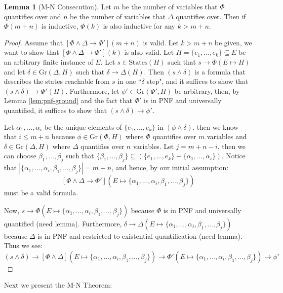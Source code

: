 \documentclass[12pt]{article}
\theoremstyle{definition}
\newtheorem{lemma}{Lemma}
\theoremstyle{remark}
\newcommand{\states}{\text{States}}
\newcommand{\gr}{\text{Gr}}
\begin{document}
\begin{lemma}[M-N Consecution]
  Let $m$ be the number of variables that $\Phi$ quantifies over and $n$ be the number of variables that $\Delta$ quantifies over.  Then if $\Phi(m+n)$ is inductive, $\Phi(k)$ is also inductive for any $k>m+n$.
\end{lemma}
\begin{proof}
  Assume that $[\Phi\land\Delta \rightarrow \Phi'](m+n)$ is valid.  Let $k>m+n$ be given, we want to show that $[\Phi\land\Delta \rightarrow \Phi'](k)$ is also valid.  Let $H = \{e_1,...,e_k\} \subseteq E$ be an arbitrary finite instance of $E$.  Let $s \in \states(H)$ such that $s \rightarrow \Phi(E \mapsto H)$ and let $\delta \in \gr(\Delta,H)$ such that $\delta \rightarrow \Delta(H)$.  Then $(s \land \delta)$ is a formula that describes the states reachable from $s$ in one ``$\delta$ step", and it suffices to show that $(s \land \delta) \rightarrow \Phi'(H)$.  Furthermore, let $\phi' \in \gr(\Phi',H)$ be arbitrary, then, by Lemma \ref{lem:pnf-ground} and the fact that $\Phi'$ is in PNF and universally quantified, it suffices to show that $(s \land \delta) \rightarrow \phi'$.

  Let $\alpha_1,...,\alpha_i$ be the unique elements of $\{e_1,...,e_k\}$ in $(\phi \land \delta)$, then we know that $i \leq m+n$ because $\phi \in \gr(\Phi,H)$ where $\Phi$ quantifies over $m$ variables and $\delta \in \gr(\Delta,H)$ where $\Delta$ quantifies over $n$ variables.  Let $j = m+n-i$, then we can choose $\beta_1,...,\beta_j$ such that $\{\beta_1,...,\beta_j\} \subseteq (\{e_1,...,e_k\}-\{\alpha_1,...,\alpha_i\})$.  Notice that $|\{\alpha_1,...,\alpha_i,\beta_1,...,\beta_j\}|=m+n$, and hence, by our initial assumption:
  $$[\Phi\land\Delta \rightarrow \Phi'](E \mapsto \{\alpha_1,...,\alpha_i,\beta_1,...,\beta_j\})$$
  must be a valid formula.

  Now, $s \rightarrow \Phi(E \mapsto \{\alpha_1,...,\alpha_i,\beta_1,...,\beta_j\})$ because $\Phi$ is in PNF and universally quantified (need lemma).  Furthermore, $\delta \rightarrow \Delta(E \mapsto \{\alpha_1,...,\alpha_i,\beta_1,...,\beta_j\})$ because $\Delta$ is in PNF and restricted to existential quantification (need lemma).  Thus we see:
  $$(s \land \delta) \rightarrow [\Phi\land\Delta](E \mapsto \{\alpha_1,...,\alpha_i,\beta_1,...,\beta_j\}) \rightarrow \Phi'(E \mapsto \{\alpha_1,...,\alpha_i,\beta_1,...,\beta_j\}) \rightarrow \phi'$$
\end{proof}

Next we present the M-N Theorem:
\end{document}
